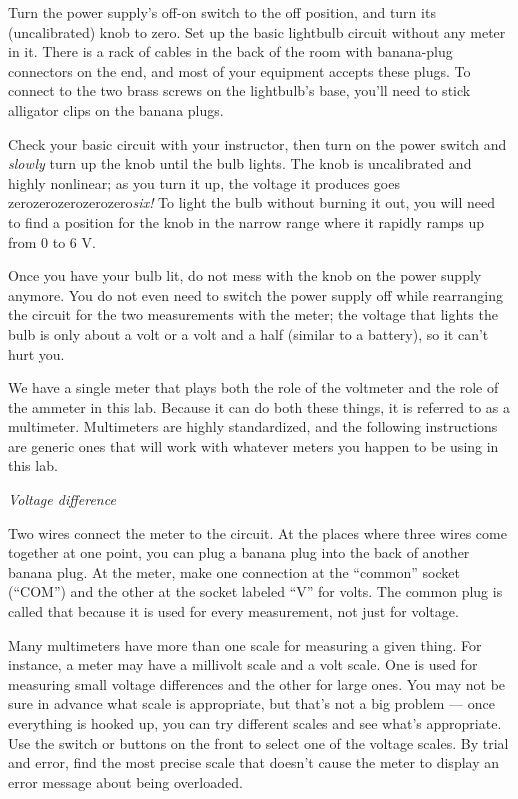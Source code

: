 Turn the power supply's off-on switch to the off position, and
turn its (uncalibrated) knob to zero.
Set up the basic lightbulb circuit without any meter in it.
There is a rack of cables in the back of the room with banana-plug
connectors on the end, and
most of your equipment accepts these plugs.
To connect to the two brass screws on the lightbulb's base, you'll
need to stick alligator clips on the banana plugs. 

Check your basic circuit with your instructor, then turn on the power
switch and \emph{slowly} turn up the knob until the bulb lights.
The knob is uncalibrated and highly nonlinear; as you turn it up,
the voltage it produces goes zerozerozerozerozero\emph{six!}
To light the bulb without burning it out, you will need to
find a position for the knob in the narrow range where it
rapidly ramps up from 0 to 6 V.

Once you have your bulb lit, do not mess with the knob on the
power supply anymore. You do not even need to switch the power
supply off while rearranging the circuit for the two measurements
with the meter; the voltage that lights the bulb is only about
a volt or a volt and a half (similar to a battery), so it can't
hurt you.

We have a single meter that plays both the role of the voltmeter
and the role of the ammeter in this lab. Because it can do both
these things, it is referred to as a multimeter. Multimeters are
highly standardized, and the following instructions are generic
ones that will work with whatever meters you happen to be using
in this lab.

\emph{Voltage difference}

Two wires connect the meter to the circuit. 
At the places where three wires come together at
one point, you can plug a banana plug into the back of
another banana plug. At the meter, make one connection
at the ``common'' socket (``COM'') and the other at the
socket labeled ``V'' for volts. The common plug is called
that because it is used for every measurement, not just for
voltage.

Many multimeters have more than one scale for
measuring a given thing. For instance, a meter may have a
millivolt scale and a volt scale. One is used for measuring
small voltage differences and the other for large ones. You may not
be sure in advance what scale is appropriate, but that's not
a big problem --- once everything is hooked up, you can try
different scales and see what's appropriate. Use the switch
or buttons on the front to select one of the voltage scales.
By trial and error, find the most precise scale that doesn't
cause the meter to display an error message about being overloaded.


